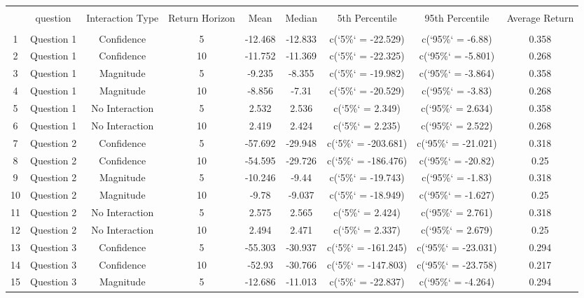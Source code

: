 
\begin{table}[!htbp] \centering 
  \caption{} 
  \label{} 
\begin{tabular}{@{\extracolsep{5pt}} ccccccccc} 
\\[-1.8ex]\hline 
\hline \\[-1.8ex] 
 & question & Interaction Type & Return Horizon & Mean & Median & 5th Percentile & 95th Percentile & Average Return \\ 
\hline \\[-1.8ex] 
1 & Question 1 & Confidence & 5 & -12.468 & -12.833 & c(`5\%` = -22.529) & c(`95\%` = -6.88) & 0.358 \\ 
2 & Question 1 & Confidence & 10 & -11.752 & -11.369 & c(`5\%` = -22.325) & c(`95\%` = -5.801) & 0.268 \\ 
3 & Question 1 & Magnitude & 5 & -9.235 & -8.355 & c(`5\%` = -19.982) & c(`95\%` = -3.864) & 0.358 \\ 
4 & Question 1 & Magnitude & 10 & -8.856 & -7.31 & c(`5\%` = -20.529) & c(`95\%` = -3.83) & 0.268 \\ 
5 & Question 1 & No Interaction & 5 & 2.532 & 2.536 & c(`5\%` = 2.349) & c(`95\%` = 2.634) & 0.358 \\ 
6 & Question 1 & No Interaction & 10 & 2.419 & 2.424 & c(`5\%` = 2.235) & c(`95\%` = 2.522) & 0.268 \\ 
7 & Question 2 & Confidence & 5 & -57.692 & -29.948 & c(`5\%` = -203.681) & c(`95\%` = -21.021) & 0.318 \\ 
8 & Question 2 & Confidence & 10 & -54.595 & -29.726 & c(`5\%` = -186.476) & c(`95\%` = -20.82) & 0.25 \\ 
9 & Question 2 & Magnitude & 5 & -10.246 & -9.44 & c(`5\%` = -19.743) & c(`95\%` = -1.83) & 0.318 \\ 
10 & Question 2 & Magnitude & 10 & -9.78 & -9.037 & c(`5\%` = -18.949) & c(`95\%` = -1.627) & 0.25 \\ 
11 & Question 2 & No Interaction & 5 & 2.575 & 2.565 & c(`5\%` = 2.424) & c(`95\%` = 2.761) & 0.318 \\ 
12 & Question 2 & No Interaction & 10 & 2.494 & 2.471 & c(`5\%` = 2.337) & c(`95\%` = 2.679) & 0.25 \\ 
13 & Question 3 & Confidence & 5 & -55.303 & -30.937 & c(`5\%` = -161.245) & c(`95\%` = -23.031) & 0.294 \\ 
14 & Question 3 & Confidence & 10 & -52.93 & -30.766 & c(`5\%` = -147.803) & c(`95\%` = -23.758) & 0.217 \\ 
15 & Question 3 & Magnitude & 5 & -12.686 & -11.013 & c(`5\%` = -22.837) & c(`95\%` = -4.264) & 0.294 \\ 

\end{tabular}
\end{table}
